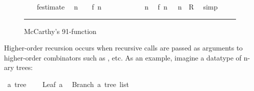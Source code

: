 \begin{isabellebody}
\begin{figure}
\begin{minipage}{0.8\textwidth}
\isanewline
\ \ \isamarkupfalse%
\ f{}{}{}estimate\ \isamarkupfalse%
\ {}n\ {}\ {}{}\ {}\ f{}{}\ {}n\ {}\ {}{}{}\ {}\ {}{}{}\ \isamarkupfalse%
\isanewline
\ \ \isamarkupfalse%
\ {}{}\ {}{}{}\ {}\ n{}\ \isamarkupfalse%
\ {}{}f{}{}\ {}n\ {}\ {}{}{}{}\ n{}\ {}\ {}R{}\ \isamarkupfalse%
\ simp\isanewline
{}\isamarkupfalse%
%
\endisatagproof
{\isafoldproof}%
%
\isadelimproof
%
\endisadelimproof
%
\isamarkupfalse{}
\end{minipage}
\vspace{6pt}\hrule
\caption{McCarthy's 91-function}\label{f91}
\end{figure}
%
\isamarkuptrue%
%
\begin{isamarkuptext}%
Higher-order recursion occurs when recursive calls
  are passed as arguments to higher-order combinators such as ,  etc.
  As an example, imagine a datatype of n-ary trees:%
\end{isamarkuptext}%
\isamarkuptrue%
\isamarkupfalse%
\ {}a\ tree\ {}\ \isanewline
\ \ Leaf\ {}a\ \isanewline
{}\ Branch\ {}{}a\ tree\ list{}%
\begin{isamarkuptext}%

\end{isamarkuptext}
\end{isabellebody}
